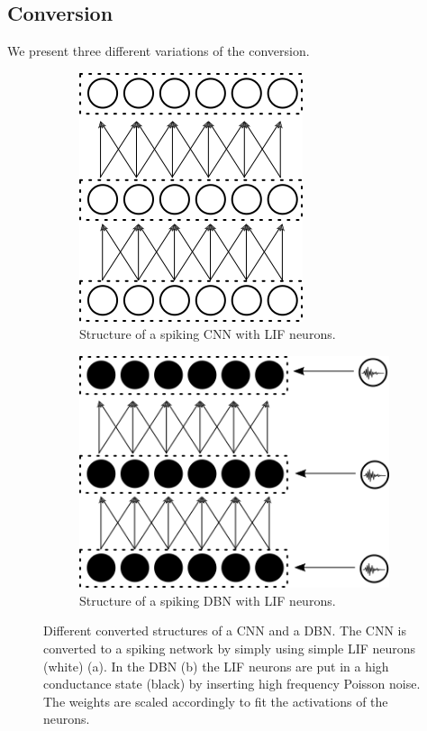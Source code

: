 \subsection{Conversion} \label{c:conversionappr}

We present three different variations of the conversion.

\begin{figure}
	\centering
	\begin{subfigure}[t]{.5\textwidth}
  		\centering
  		\includegraphics[width=.54\linewidth]{imgs/convert_cnn.png}
  		\caption{Structure of a spiking CNN with LIF neurons.}
  		\label{fig:converted1}
	\end{subfigure}%
	\begin{subfigure}[t]{.5\textwidth}
  		\centering
  		\includegraphics[width=.8\linewidth]{imgs/convert_dbn.png}
  		\caption{Structure of a spiking DBN with LIF neurons.}
  		\label{fig:converted2}
  	\end{subfigure}
	\caption[Different converted structures of a CNN and a DBN.]{Different converted structures of a CNN and a DBN. The CNN is converted to a spiking network by simply using simple LIF neurons (white) (a). In the DBN (b) the LIF neurons are put in a high conductance state (black) by inserting high frequency Poisson noise. The weights are scaled accordingly to fit the activations of the neurons.}
	\label{fig:converted}
\end{figure}


